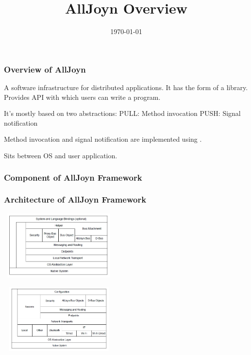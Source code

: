 \documentclass{beamer}
\title{AllJoyn Overview}
\author{}
\date{\today}
\begin{document}
\begin{frame}
\titlepage
\end{frame}


\begin{frame}
\frametitle{Overview of AllJoyn}

\bit
\w A software infrastructure for distributed applications.
\w It has the form of a library.
\w Provides API with which users can write a program.
\eit

\vspace*{0.3cm}

\bit
\w It's mostly based on two abstractions:
  \bit
  \w PULL: Method invocation
  \w PUSH: Signal notification 
  \eit
\eit

\vspace*{0.3cm}

\bit
\w Method invocation and signal notification are implemented 
   using .
\eit

\bit
\w Sits between OS and user application.
\eit
\end{frame}

\begin{frame}
\frametitle{Component of AllJoyn Framework}
\end{frame}

\begin{frame}
\frametitle{Architecture of AllJoyn Framework}

\centerline{\includegraphics[height=3.5cm,width=6cm]{aj}}

\centerline{\includegraphics[height=3.5cm,width=6cm]{ajd}}


\end{frame}
\end{document}
